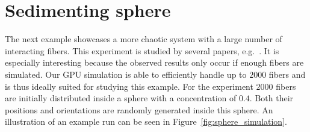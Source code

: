 \section{Sedimenting sphere}
\label{sec:example_sphere}

The next example showcases a more chaotic system with a large number of interacting fibers. This experiment is studied by several papers, e.g.~\cite{Metzger2007}\cite{Park2010}\cite{Bulow2015}. It is especially interesting because the observed results only occur if enough fibers are simulated. Our GPU simulation is able to efficiently handle up to $2000$ fibers and is thus ideally suited for studying this example. For the experiment $2000$ fibers are initially distributed inside a sphere with a concentration of $0.4$. Both their positions and orientations are randomly generated inside this sphere. An illustration of an example run can be seen in Figure~\ref{fig:sphere_simulation}.

